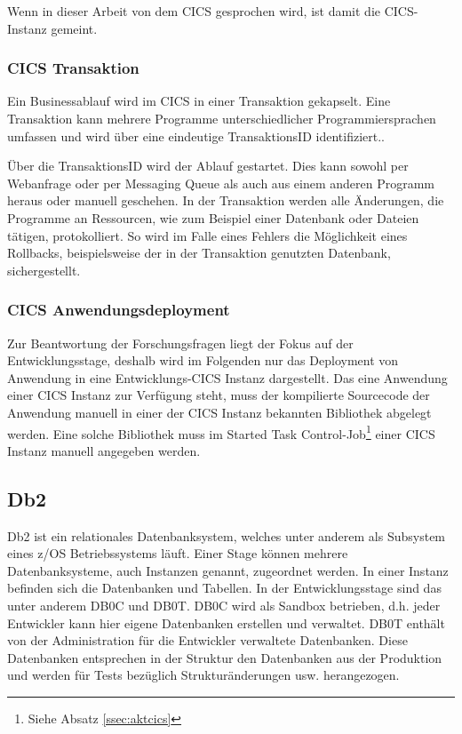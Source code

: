 Wenn in dieser Arbeit von dem CICS gesprochen wird, ist damit die CICS-Instanz  gemeint.

\subsubsection{CICS Transaktion}\label{subsec:trans}
Ein Businessablauf wird im CICS in einer Transaktion gekapselt.
Eine Transaktion kann mehrere Programme unterschiedlicher Programmiersprachen umfassen und wird über eine eindeutige \glqq TransaktionsID\grqq{} identifiziert..

Über die TransaktionsID wird der Ablauf gestartet.
Dies kann sowohl per Webanfrage oder per Messaging Queue als auch aus einem anderen Programm heraus oder manuell geschehen.
In der Transaktion werden alle Änderungen, die Programme an Ressourcen, wie zum Beispiel einer Datenbank oder Dateien tätigen, protokolliert.
So wird im Falle eines Fehlers die Möglichkeit eines Rollbacks, beispielsweise der in der Transaktion genutzten Datenbank, sichergestellt.
 \cite{Rayns.2011}

\subsubsection{CICS Anwendungsdeployment}\label{sssec:cicsanwd}
Zur Beantwortung der Forschungsfragen liegt der Fokus auf der Entwicklungsstage, deshalb wird im Folgenden nur das Deployment von Anwendung in eine Entwicklungs-CICS Instanz dargestellt.
Das eine Anwendung einer CICS Instanz zur Verfügung steht, muss der kompilierte Sourcecode der Anwendung manuell in einer der CICS Instanz bekannten Bibliothek abgelegt werden.
Eine solche Bibliothek muss im \glqq Started Task Control-Job\grqq{}\footnote{Siehe Absatz \ref{ssec:aktcics}} einer CICS Instanz manuell angegeben werden.

\subsection{Db2}\label{sssec:db2}
Db2 ist ein relationales Datenbanksystem, welches unter anderem als Subsystem eines z/OS Betriebssystems läuft.
Einer Stage können mehrere Datenbanksysteme, auch Instanzen genannt, zugeordnet werden.
In einer Instanz befinden sich die Datenbanken und Tabellen. 
In der Entwicklungsstage sind das unter anderem \glqq DB0C\grqq{} und \glqq DB0T\grqq.
DB0C wird als Sandbox betrieben, d.h. jeder Entwickler kann hier eigene Datenbanken erstellen und verwaltet.
DB0T enthält von der Administration für die Entwickler verwaltete Datenbanken.
Diese Datenbanken entsprechen in der Struktur den Datenbanken aus der Produktion und werden für Tests bezüglich Strukturänderungen usw. herangezogen.

